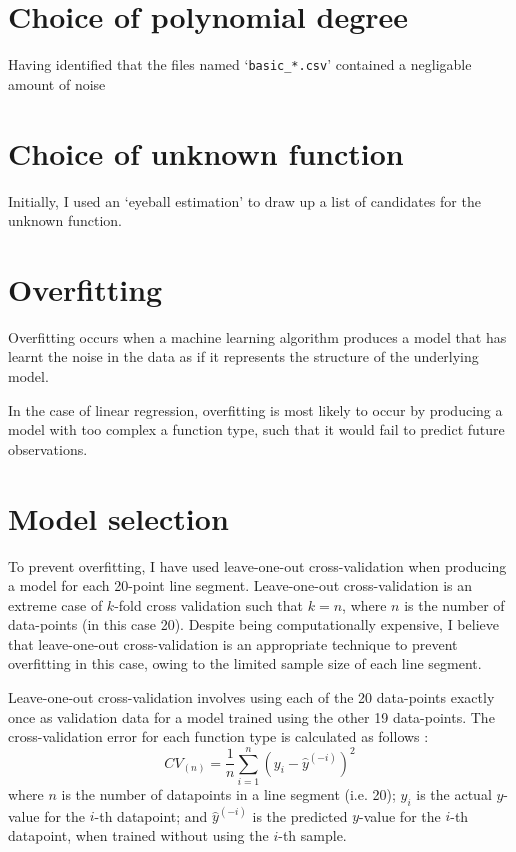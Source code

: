 \documentclass[onecolumn, 12pt, a4paper]{article}
\begin{document}
\section{Choice of polynomial degree}

Having identified that the files named `\texttt{basic\_*.csv}'
contained a negligable amount of noise


\section{Choice of unknown function}

Initially, I used an `eyeball estimation' to draw up a list
of candidates for the unknown function.

\section{Overfitting}

Overfitting occurs when a machine learning algorithm
produces a model that has learnt the noise in the data
as if it represents the structure of the underlying
model. \cite{MSMI}

In the case of linear regression, overfitting is most
likely to occur by producing a model with too complex a function
type, such that it would fail to predict future observations.

\section{Model selection}

To prevent overfitting, I have used leave-one-out
cross-validation when producing a model for each 20-point
line segment. Leave-one-out cross-validation is 
an extreme case of $k$-fold cross validation
such that $k = n$, where
$n$ is the number of data-points (in this case 20).
Despite being computationally expensive, I believe that
leave-one-out cross-validation is an appropriate technique
to prevent overfitting in this case,
owing to the limited sample size of each line segment.

Leave-one-out cross-validation involves using each of
the 20 data-points exactly once as validation data for a model
trained using the other 19 data-points. 
The cross-validation error for each function type is calculated
as follows \cite{Stanford}:
\[
    CV_{(n)} = \frac{1}{n} \sum_{i = 1}^{n} (y_{i} - \hat{y}^{(-i)})^{2}
\]
where
$n$ is the number of datapoints in a line segment (i.e. 20);
$y_{i}$ is the actual $y$-value for the $i$-th datapoint;
and $\hat{y}^{(-i)}$ is the predicted $y$-value for the $i$-th
datapoint, when trained without using the $i$-th sample.
\end{document}

